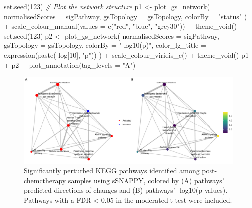 \documentclass[9pt,a4paper,]{extarticle}
\newenvironment{Shaded}{\begin{snugshade}}{\end{snugshade}}
\newcommand{\AttributeTok}[1]{\textcolor[rgb]{0.77,0.63,0.00}{#1}}
\newcommand{\CommentTok}[1]{\textcolor[rgb]{0.56,0.35,0.01}{\textit{#1}}}
\newcommand{\DecValTok}[1]{\textcolor[rgb]{0.00,0.00,0.81}{#1}}
\newcommand{\FunctionTok}[1]{\textcolor[rgb]{0.00,0.00,0.00}{#1}}
\newcommand{\NormalTok}[1]{#1}
\newcommand{\OtherTok}[1]{\textcolor[rgb]{0.56,0.35,0.01}{#1}}
\newcommand{\SpecialCharTok}[1]{\textcolor[rgb]{0.00,0.00,0.00}{#1}}
\newcommand{\StringTok}[1]{\textcolor[rgb]{0.31,0.60,0.02}{#1}}
\begin{document}
\begin{Shaded}
\begin{Highlighting}[]
\FunctionTok{set.seed}\NormalTok{(}\DecValTok{123}\NormalTok{)}
\CommentTok{\# Plot the network structure}
\NormalTok{p1 }\OtherTok{\textless{}{-}} \FunctionTok{plot\_gs\_network}\NormalTok{(}
  \AttributeTok{normalisedScores =}\NormalTok{ sigPathway, }\AttributeTok{gsTopology =}\NormalTok{ gsTopology, }\AttributeTok{colorBy =} \StringTok{"status"}
\NormalTok{) }\SpecialCharTok{+}
  \FunctionTok{scale\_colour\_manual}\NormalTok{(}\AttributeTok{values =} \FunctionTok{c}\NormalTok{(}\StringTok{"red"}\NormalTok{, }\StringTok{"blue"}\NormalTok{, }\StringTok{"grey30"}\NormalTok{)) }\SpecialCharTok{+}
  \FunctionTok{theme\_void}\NormalTok{()}
\FunctionTok{set.seed}\NormalTok{(}\DecValTok{123}\NormalTok{)}
\NormalTok{p2 }\OtherTok{\textless{}{-}} \FunctionTok{plot\_gs\_network}\NormalTok{(}
  \AttributeTok{normalisedScores =}\NormalTok{ sigPathway,}
  \AttributeTok{gsTopology =}\NormalTok{ gsTopology, }
  \AttributeTok{colorBy  =} \StringTok{"{-}log10(p)"}\NormalTok{, }\AttributeTok{color\_lg\_title =} \FunctionTok{expression}\NormalTok{(}\FunctionTok{paste}\NormalTok{(}\SpecialCharTok{{-}}\NormalTok{log[}\DecValTok{10}\NormalTok{], }\StringTok{"p"}\NormalTok{))}
\NormalTok{) }\SpecialCharTok{+}
  \FunctionTok{scale\_colour\_viridis\_c}\NormalTok{() }\SpecialCharTok{+}
  \FunctionTok{theme\_void}\NormalTok{()}
\NormalTok{p1 }\SpecialCharTok{+}\NormalTok{ p2 }\SpecialCharTok{+} \FunctionTok{plot\_annotation}\NormalTok{(}\AttributeTok{tag\_levels =} \StringTok{"A"}\NormalTok{)}
\end{Highlighting}
\end{Shaded}

\begin{figure}

{\centering \includegraphics[width=1\linewidth]{sSNAPPY_paper_files/figure-latex/Figure2-1} 

}

\caption{Significantly perturbed KEGG pathways identified among post-chemotherapy samples using sSNAPPY, colored by (A) pathways’ predicted directions of changes and (B) pathways’ -log10(p-values). Pathways with a FDR < 0.05 in the moderated t-test were included.}\label{fig:Figure2}
\end{figure}
\end{document}
